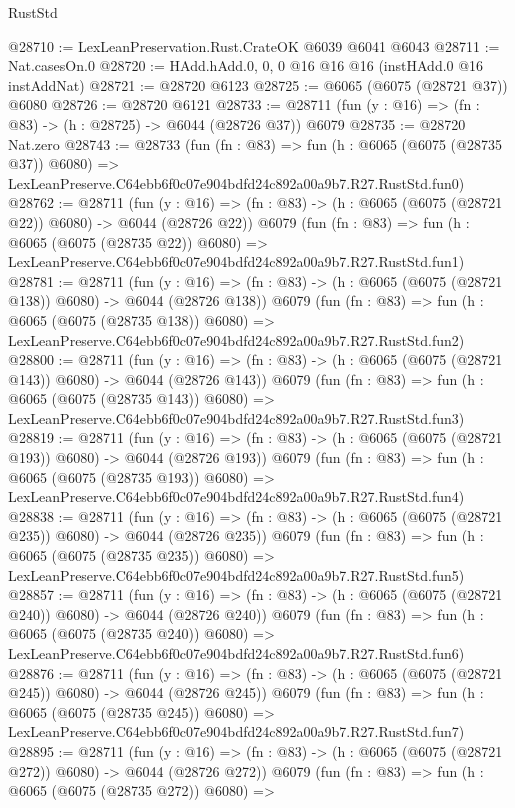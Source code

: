 \begin{lexlean}{RustStd}
\begin{coremodule}
@28710 := LexLeanPreservation.Rust.CrateOK @6039 @6041 @6043
@28711 := Nat.casesOn.{0}
@28720 := HAdd.hAdd.{0, 0, 0} @16 @16 @16 (instHAdd.{0} @16 instAddNat)
@28721 := @28720 @6123
@28725 := @6065 (@6075 (@28721 @37)) @6080
@28726 := @28720 @6121
@28733 := @28711 (fun (y : @16) => (fn : @83) -> (h : @28725) -> @6044 (@28726 @37)) @6079
@28735 := @28720 Nat.zero
@28743 := @28733
    (fun (fn : @83) =>
    fun (h : @6065 (@6075 (@28735 @37)) @6080) =>
    LexLeanPreserve.C64ebb6f0c07e904bdfd24c892a00a9b7.R27.RustStd.fun0)
@28762 := @28711
    (fun (y : @16) => (fn : @83) -> (h : @6065 (@6075 (@28721 @22)) @6080) -> @6044 (@28726 @22))
    @6079
    (fun (fn : @83) =>
    fun (h : @6065 (@6075 (@28735 @22)) @6080) =>
    LexLeanPreserve.C64ebb6f0c07e904bdfd24c892a00a9b7.R27.RustStd.fun1)
@28781 := @28711
    (fun (y : @16) => (fn : @83) -> (h : @6065 (@6075 (@28721 @138)) @6080) -> @6044 (@28726 @138))
    @6079
    (fun (fn : @83) =>
    fun (h : @6065 (@6075 (@28735 @138)) @6080) =>
    LexLeanPreserve.C64ebb6f0c07e904bdfd24c892a00a9b7.R27.RustStd.fun2)
@28800 := @28711
    (fun (y : @16) => (fn : @83) -> (h : @6065 (@6075 (@28721 @143)) @6080) -> @6044 (@28726 @143))
    @6079
    (fun (fn : @83) =>
    fun (h : @6065 (@6075 (@28735 @143)) @6080) =>
    LexLeanPreserve.C64ebb6f0c07e904bdfd24c892a00a9b7.R27.RustStd.fun3)
@28819 := @28711
    (fun (y : @16) => (fn : @83) -> (h : @6065 (@6075 (@28721 @193)) @6080) -> @6044 (@28726 @193))
    @6079
    (fun (fn : @83) =>
    fun (h : @6065 (@6075 (@28735 @193)) @6080) =>
    LexLeanPreserve.C64ebb6f0c07e904bdfd24c892a00a9b7.R27.RustStd.fun4)
@28838 := @28711
    (fun (y : @16) => (fn : @83) -> (h : @6065 (@6075 (@28721 @235)) @6080) -> @6044 (@28726 @235))
    @6079
    (fun (fn : @83) =>
    fun (h : @6065 (@6075 (@28735 @235)) @6080) =>
    LexLeanPreserve.C64ebb6f0c07e904bdfd24c892a00a9b7.R27.RustStd.fun5)
@28857 := @28711
    (fun (y : @16) => (fn : @83) -> (h : @6065 (@6075 (@28721 @240)) @6080) -> @6044 (@28726 @240))
    @6079
    (fun (fn : @83) =>
    fun (h : @6065 (@6075 (@28735 @240)) @6080) =>
    LexLeanPreserve.C64ebb6f0c07e904bdfd24c892a00a9b7.R27.RustStd.fun6)
@28876 := @28711
    (fun (y : @16) => (fn : @83) -> (h : @6065 (@6075 (@28721 @245)) @6080) -> @6044 (@28726 @245))
    @6079
    (fun (fn : @83) =>
    fun (h : @6065 (@6075 (@28735 @245)) @6080) =>
    LexLeanPreserve.C64ebb6f0c07e904bdfd24c892a00a9b7.R27.RustStd.fun7)
@28895 := @28711
    (fun (y : @16) => (fn : @83) -> (h : @6065 (@6075 (@28721 @272)) @6080) -> @6044 (@28726 @272))
    @6079
    (fun (fn : @83) =>
    fun (h : @6065 (@6075 (@28735 @272)) @6080) =>

\end{coremodule}
\end{lexlean}
